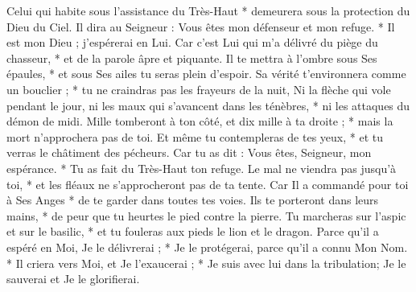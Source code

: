 Celui qui habite sous l'assistance du Très-Haut * demeurera sous la protection du Dieu du Ciel.
\versseparator
Il dira au Seigneur : Vous êtes mon défenseur et mon refuge. * Il est mon Dieu ; j'espérerai en Lui.
\versseparator
Car c'est Lui qui m'a délivré du piège du chasseur, * et de la parole âpre et piquante.
\versseparator
Il te mettra à l'ombre sous Ses épaules, * et sous Ses ailes tu seras plein d'espoir.
\versseparator
Sa vérité t'environnera comme un bouclier ; * tu ne craindras pas les frayeurs de la nuit,
\versseparator
Ni la flèche qui vole pendant le jour, ni les maux qui s'avancent dans les ténèbres, * ni les attaques du démon de midi.
\versseparator
Mille tomberont à ton côté, et dix mille à ta droite ; * mais la mort n'approchera pas de toi.
\versseparator
Et même tu contempleras de tes yeux, * et tu verras le châtiment des pécheurs.
\versseparator
Car tu as dit : Vous êtes, Seigneur, mon espérance. * Tu as fait du Très-Haut ton refuge.
\versseparator
Le mal ne viendra pas jusqu'à toi, * et les fléaux ne s'approcheront pas de ta tente.
\versseparator
Car Il a commandé pour toi à Ses Anges * de te garder dans toutes tes voies.
\versseparator
Ils te porteront dans leurs mains, * de peur que tu heurtes le pied contre la pierre.
\versseparator
Tu marcheras sur l'aspic et sur le basilic, * et tu fouleras aux pieds le lion et le dragon.
\versseparator
Parce qu'il a espéré en Moi, Je le délivrerai ; * Je le protégerai, parce qu'il a connu Mon Nom. *
\versseparator
Il criera vers Moi, et Je l'exaucerai ; * Je suis avec lui dans la tribulation; Je le sauverai et Je le glorifierai.